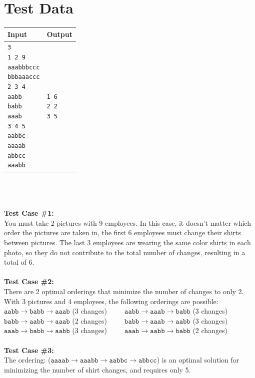 \documentclass[11pt]{article}
\begin{document}
\section{Test Data}
\begin{tabularx}{\textwidth}{|X|X|}
	\hline
	Input & Output \\ \hline
	\parbox[t]{5cm}{
	\texttt{3\\
			1 2 9\\
			aaabbbccc\\
			bbbaaaccc\\
			2 3 4\\
			aabb\\
			babb\\
			aaab\\
			3 4 5\\
			aabbc\\
			aaaab\\
			abbcc\\
			aaabb\\
	}} &
	\parbox[t]{5cm}{
	\texttt{1 6\\
			2 2\\
			3 5\\
			}}\\
	\hline
\end{tabularx}
\\\\\\
\textbf{Test Case \#1:}\\
You must take 2 pictures with 9 employees. In this case, it doesn't matter which order the
pictures are taken in, the first 6 employees must change their shirts between pictures. The
last 3 employees are wearing the same color shirts in each photo, so they do not contribute
to the total number of changes, resulting in a total of 6.
\\\\
\textbf{Test Case \#2:}\\
There are 2 optimal orderings that minimize the number of changes to only 2.\\
With 3 pictures and 4 employees, the following orderings are possible:\\
$\texttt{aabb} \rightarrow \texttt{babb} \rightarrow \texttt{aaab}$ (3 changes)\ \ \ \ \ 
$\texttt{aabb} \rightarrow \texttt{aaab} \rightarrow \texttt{babb}$ (3 changes)\\
$\texttt{babb} \rightarrow \texttt{aabb} \rightarrow \texttt{aaab}$ (2 changes)\ \ \ \ \ 
$\texttt{babb} \rightarrow \texttt{aaab} \rightarrow \texttt{aabb}$ (3 changes)\\
$\texttt{aaab} \rightarrow \texttt{babb} \rightarrow \texttt{aabb}$ (3 changes)\ \ \ \ \ 
$\texttt{aaab} \rightarrow \texttt{aabb} \rightarrow \texttt{babb}$ (2 changes)
\\\\
\textbf{Test Case \#3:}\\
The ordering:
($\texttt{aaaab} \rightarrow \texttt{aaabb} \rightarrow \texttt{aabbc} \rightarrow \texttt{abbcc}$)
is an optimal solution for minimizing the number of shirt changes, and requires only 5.
\end{document}
